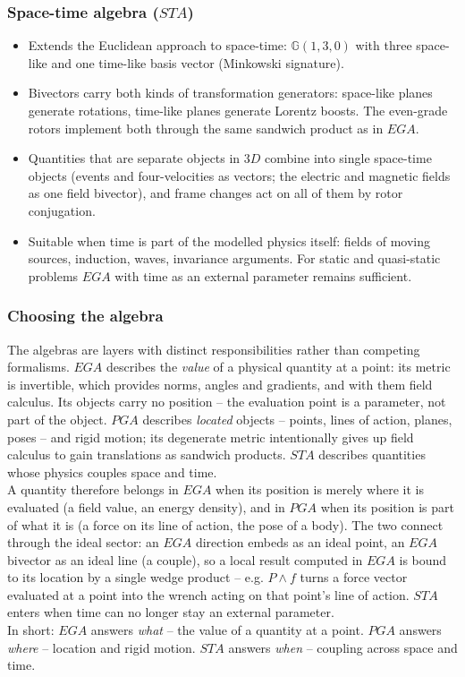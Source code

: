 \subsubsection{Space-time algebra ($STA$)}

\begin{itemize}
    \item Extends the Euclidean approach to space-time: $\mathbb{G}(1,3,0)$ with three
    space-like and one time-like basis vector (Minkowski signature).
    \item Bivectors carry both kinds of transformation generators: space-like planes
    generate rotations, time-like planes generate Lorentz boosts. The even-grade rotors
    implement both through the same sandwich product as in $EGA$.
    \item Quantities that are separate objects in $3D$ combine into single space-time
    objects (events and four-velocities as vectors; the electric and magnetic fields as
    one field bivector), and frame changes act on all of them by rotor conjugation.
    \item Suitable when time is part of the modelled physics itself: fields of moving
    sources, induction, waves, invariance arguments. For static and quasi-static
    problems $EGA$ with time as an external parameter remains sufficient.
\end{itemize}

\subsubsection{Choosing the algebra}
\label{subsubsection:choosing_the_algebra}

The algebras are layers with distinct responsibilities rather than competing
formalisms. $EGA$ describes the \emph{value} of a physical quantity at a point: its
metric is invertible, which provides norms, angles and gradients, and with them field
calculus. Its objects carry no position -- the evaluation point is a parameter, not
part of the object. $PGA$ describes \emph{located} objects -- points, lines of action,
planes, poses -- and rigid motion; its degenerate metric intentionally gives up field
calculus to gain translations as sandwich products. $STA$ describes quantities whose
physics couples space and time. \\

A quantity therefore belongs in $EGA$ when its position is merely where it is evaluated
(a field value, an energy density), and in $PGA$ when its position is part of what it
is (a force on its line of action, the pose of a body). The two connect through the
ideal sector: an $EGA$ direction embeds as an ideal point, an $EGA$ bivector as an
ideal line (a couple), so a local result computed in $EGA$ is bound to its location by
a single wedge product -- e.g. $P \wedge f$ turns a force vector evaluated at a point
into the wrench acting on that point's line of action. $STA$ enters when time can no
longer stay an external parameter. \\

In short: $EGA$ answers \emph{what} -- the value of a quantity at a point. $PGA$
answers \emph{where} -- location and rigid motion. $STA$ answers \emph{when} --
coupling across space and time.

\newpage